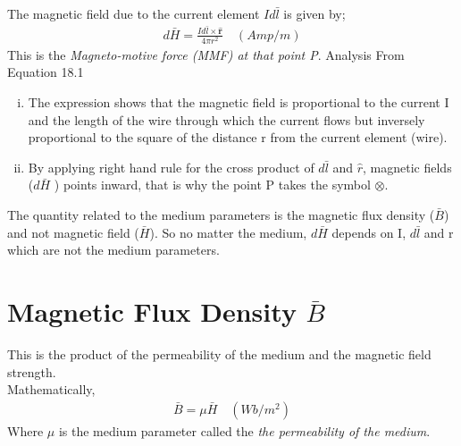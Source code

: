 The magnetic field due to the current element $Id\bar{l}$ is given by; \\
\begin{align}
\boxed{d\bar{H}= \frac{Id\bar{l} \times \hat{\textbf{r}}}{4\pi r^{2}}}\quad (Amp/m)
\end{align} 
This is the \emph{Magneto-motive force (MMF) at that point P}. Analysis From Equation 18.1
\begin{enumerate}[(i)]
\item The expression shows that the magnetic field is proportional to the current I and the length of the wire through which the current flows but inversely proportional to the square of the distance r from the current element (wire).
\item By applying right hand rule for the cross product of $d\bar{l}$ and $\hat{r}$, magnetic fields ($d\bar{H}$ ) points inward, that is why the point P takes the symbol $\otimes$.
\end{enumerate}

The quantity related to the medium parameters is the magnetic flux density ($\bar{B}$) and not magnetic field ($\bar{H}$). So no matter the medium, $ d\bar{H} $ depends on I, $ d\bar{l} $ and r which are not the medium parameters. 

\section{Magnetic Flux Density $\bar{B}$}
This is the product of the permeability of the medium and the magnetic field strength.\\
Mathematically, 
\begin{align}
\boxed{\bar{B} = \mu\bar{H}}\quad (Wb/m^{2})
\end{align}
Where $ \mu $ is the medium parameter called the \emph{the permeability of the medium}.

